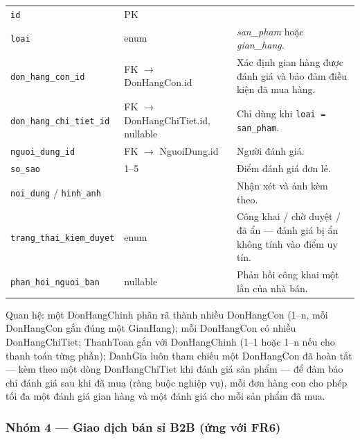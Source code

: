 \begin{longtable}{L{3.5cm} L{3.3cm} L{6.1cm}}
\texttt{id} & PK & \\
\texttt{loai} & enum & \emph{san\_pham} hoặc \emph{gian\_hang}. \\
\texttt{don\_hang\_con\_id} & FK $\to$ DonHangCon.id & Xác định gian hàng được đánh giá và bảo đảm điều kiện đã mua hàng. \\
\texttt{don\_hang\_chi\_tiet\_id} & FK $\to$ DonHangChiTiet.id, nullable & Chỉ dùng khi \texttt{loai = san\_pham}. \\
\texttt{nguoi\_dung\_id} & FK $\to$ NguoiDung.id & Người đánh giá. \\
\texttt{so\_sao} & 1--5 & Điểm đánh giá đơn lẻ. \\
\texttt{noi\_dung} / \texttt{hinh\_anh} & & Nhận xét và ảnh kèm theo. \\
\texttt{trang\_thai\_kiem\_duyet} & enum & Công khai / chờ duyệt / đã ẩn --- đánh giá bị ẩn không tính vào điểm uy tín. \\
\texttt{phan\_hoi\_nguoi\_ban} & nullable & Phản hồi công khai một lần của nhà bán. \\
\end{longtable}
\endgroup
Quan hệ: một DonHangChinh phân rã thành nhiều DonHangCon (1--n, mỗi
DonHangCon gắn đúng một GianHang); mỗi DonHangCon có nhiều
DonHangChiTiet; ThanhToan gắn với DonHangChinh (1--1 hoặc 1--n nếu cho
thanh toán từng phần); DanhGia luôn tham chiếu một DonHangCon đã hoàn tất ---
kèm theo một dòng DonHangChiTiet khi đánh giá sản phẩm --- để đảm bảo chỉ
đánh giá sau khi đã mua (ràng buộc nghiệp vụ), mỗi đơn hàng con cho phép tối
đa một đánh giá gian hàng và một đánh giá cho mỗi sản phẩm đã mua.
 
\subsubsection*{Nhóm 4 --- Giao dịch bán sỉ B2B (ứng với FR6)}
 

